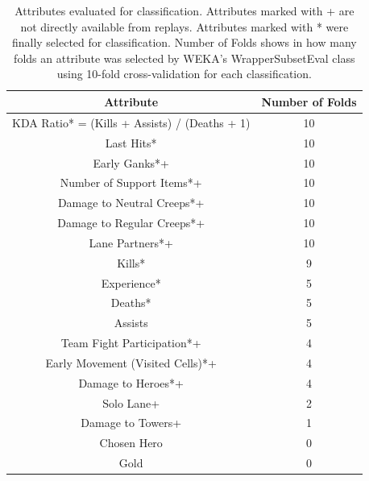 \renewcommand{\arraystretch}{1.5}
\setlength{\tabcolsep}{12pt}
\begin{table}[]
\caption{Attributes evaluated for classification. Attributes marked with + are not directly available from replays. Attributes marked with {*} were finally selected for classification. Number of Folds shows in how many folds an attribute was selected by WEKA’s WrapperSubsetEval class using 10-fold cross-validation for each classification.}
\label{table:table1}
\centering
\begin{tabular}{|c|c|}
\hline
\textbf{Attribute}                            & \textbf{Number of Folds} \\ \hline
KDA Ratio* = (Kills + Assists) / (Deaths + 1) & 10                       \\ \hline
Last Hits*                                    & 10                       \\ \hline
Early Ganks*+                                 & 10                       \\ \hline
Number of Support Items*+                     & 10                       \\ \hline
Damage to Neutral Creeps*+                    & 10                       \\ \hline
Damage to Regular Creeps*+                    & 10                       \\ \hline
Lane Partners*+                               & 10                       \\ \hline
Kills*                                        & 9                        \\ \hline
Experience*                                   & 5                        \\ \hline
Deaths*                                       & 5                        \\ \hline
Assists                                       & 5                        \\ \hline
Team Fight Participation*+                    & 4                        \\ \hline
Early Movement (Visited Cells)*+              & 4                        \\ \hline
Damage to Heroes*+                            & 4                        \\ \hline
Solo Lane+                                    & 2                        \\ \hline
Damage to Towers+                             & 1                        \\ \hline
Chosen Hero                                   & 0                        \\ \hline
Gold                                          & 0                        \\ \hline
\end{tabular}
\end{table}

